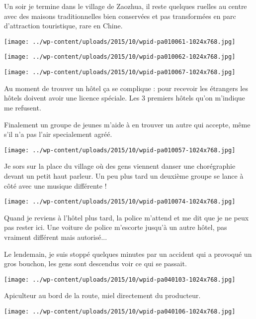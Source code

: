 \pagebreak
 Un soir je termine dans le village de Zaozhua, il reste quelques ruelles au centre avec des maisons traditionnelles bien conservées et pas transformées en parc d'attraction touristique, rare en Chine. 
\begin{center} \texttt{[image: ../wp-content/uploads/2015/10/wpid-pa010061-1024x768.jpg]} \end{center}
\begin{center} \texttt{[image: ../wp-content/uploads/2015/10/wpid-pa010062-1024x768.jpg]} \end{center}
\begin{center} \texttt{[image: ../wp-content/uploads/2015/10/wpid-pa010067-1024x768.jpg]} \end{center}

 Au moment de trouver un hôtel ça se complique : pour recevoir les étrangers les hôtels doivent avoir une licence spéciale. Les 3 premiers hôtels qu'on m'indique me refusent. 

 Finalement un groupe de jeunes m'aide à en trouver un autre qui accepte, même s'il n'a pas l'air specialement agréé.
 \begin{center} \texttt{[image: ../wp-content/uploads/2015/10/wpid-pa010057-1024x768.jpg]} \end{center}

\pagebreak
 Je sors sur la place du village où des gens viennent danser une chorégraphie devant un petit haut parleur. Un peu plus tard un deuxième groupe se lance à côté avec une musique différente ! 
\begin{center} \texttt{[image: ../wp-content/uploads/2015/10/wpid-pa010074-1024x768.jpg]} \end{center}

 Quand je reviens à l'hôtel plus tard, la police m'attend et me dit que je ne peux pas rester ici. Une voiture de police m'escorte jusqu'à un autre hôtel, pas vraiment différent mais autorisé...

  Le lendemain, je suis stoppé quelques minutes par un accident qui a provoqué un gros bouchon, les gens sont descendus voir ce qui se passait. 
\begin{center} \texttt{[image: ../wp-content/uploads/2015/10/wpid-pa040103-1024x768.jpg]} \end{center}

 Apiculteur au bord de la route, miel directement du producteur. 
\begin{center} \texttt{[image: ../wp-content/uploads/2015/10/wpid-pa040106-1024x768.jpg]} \end{center}

